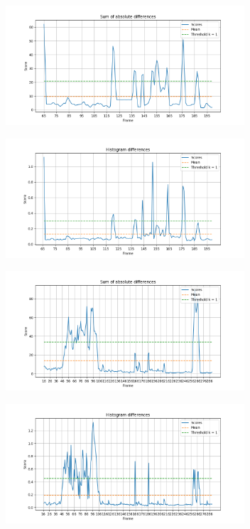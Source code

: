 \documentclass{article}
\begin{document}
\begin{minipage}{0.5\linewidth}
 \label{fig: clip_2_sad2}
\centering
\includegraphics[width=3.5in]{../output/clip_2_score_sad2.png}
\end{minipage}%
\begin{minipage}{0.5\linewidth}
 \label{fig: clip_2_hd}
\centering
\includegraphics[width=3.5in]{../output/clip_2_score_hd.png}
\end{minipage}

\begin{minipage}{0.5\linewidth}
 \label{fig: clip_3_sad2}
\centering
\includegraphics[width=3.5in]{../output/clip_3_score_sad2.png}
\end{minipage}%
\begin{minipage}{0.5\linewidth}
 \label{fig: clip_3_hd}
\centering
\includegraphics[width=3.5in]{../output/clip_3_score_hd.png}
\end{minipage}
\vspace*{10pt}
\end{document}
